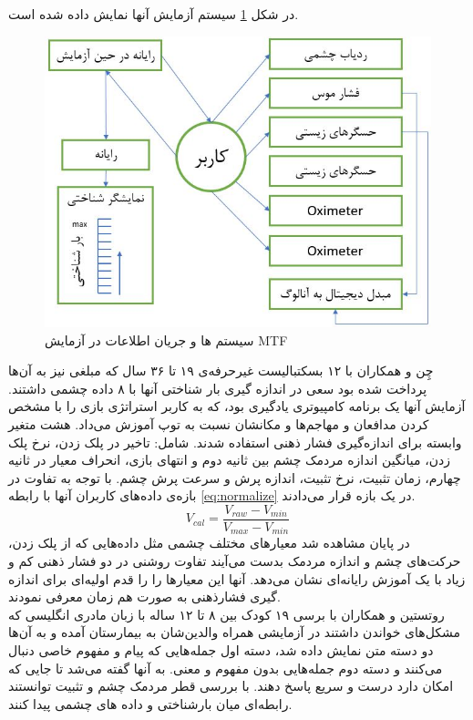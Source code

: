 در شکل 
\ref{fig:ikehara2005}
سیستم آزمایش آنها نمایش داده شده است.
\\
\begin{figure}[htbp]
	\centering
	\includegraphics[width=0.7\linewidth]{figures/ikehara2005}
	\caption[نمونه‌ای از سیستم حسگرهای فیزیولوژیکی]{سیستم ها و جریان اطلاعات در آزمایش MTF}
	\label{fig:ikehara2005}
\end{figure}
چِن و همکاران
\cite{Chen2011}
با ۱۲ بسکتبالیست غیرحرفه‌ی ۱۹ تا ۳۶ سال که مبلغی نیز به آن‌ها پرداخت شده بود سعی در اندازه گیری بار شناختی آنها با ۸ داده چشمی داشتند. آزمایش آنها یک برنامه کامپیوتری یادگیری بود، که به کاربر استراتژی بازی را با مشخص کردن مدافعان و مهاجم‌ها و مکانشان نسبت به توپ آموزش می‌داد.
هشت متغیر وابسته برای اندازه‌گیری فشار ذهنی استفاده شدند. شامل: تاخیر در پلک زدن، نرخ پلک زدن، میانگین اندازه مردمک چشم بین ثانیه دوم و انتهای بازی، انحراف معیار در ثانیه چهارم، زمان تثبیت، نرخ تثبیت،‌ اندازه پرش و سرعت پرش چشم.
با توجه به تفاوت در بازه‌ی داده‌های کاربران آنها با رابطه
\eqref{eq:normalize}
در یک بازه قرار می‌دادند.
\begin{equation}\label{eq:normalize}
V_{cal} = \dfrac{V_{raw}-V_{min}}{V_{max}-V_{min}}
\end{equation} 
در پایان مشاهده شد معیارهای مختلف چشمی مثل داده‌هایی که از پلک زدن، حرکت‌های چشم و اندازه مردمک بدست می‌آیند تفاوت روشنی در دو فشار ذهنی کم و زیاد با یک آموزش رایانه‌ای نشان می‌دهد. آنها این معیارها را را قدم اولیه‌ای برای اندازه گیری فشارذهنی به صورت هم زمان معرفی نمودند.
\\

روتستین و همکاران
\cite{ozeri2020relationship}
با برسی ۱۹ کودک بین ۸ تا ۱۲ ساله با زبان مادری انگلیسی که مشکل‌های خواندن داشتند در آزمایشی همراه والدین‌شان به بیمارستان آمده و به آن‌ها دو دسته متن نمایش داده شد، دسته اول جمله‌هایی که پیام و مفهوم خاصی دنبال می‌کنند و دسته دوم جمله‌هایی بدون مفهوم و معنی. به آنها گفته می‌شد تا جایی که امکان دارد درست و سریع پاسخ دهند. با بررسی قطر مردمک چشم و تثبیت توانستند رابطه‌ای میان بارشناختی و داده های چشمی پیدا کنند.
